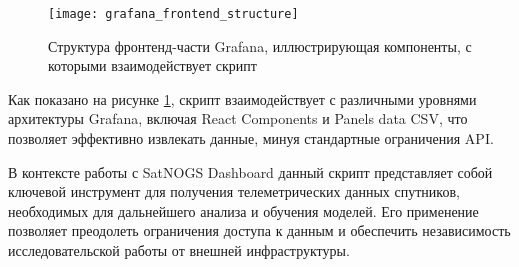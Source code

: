 \begin{figure}
	\centering
	\texttt{[image: grafana\_frontend\_structure]}
	\caption{Структура фронтенд-части Grafana, иллюстрирующая компоненты, с которыми взаимодействует скрипт}
	\label{fig:grafana_frontend_structure_advanced}
\end{figure}

Как показано на рисунке \ref{fig:grafana_frontend_structure_advanced}, скрипт
взаимодействует с различными уровнями архитектуры Grafana, включая React
Components и Panels data CSV, что позволяет эффективно извлекать данные, минуя
стандартные ограничения API.

В контексте работы с SatNOGS Dashboard данный скрипт представляет собой
ключевой инструмент для получения телеметрических данных спутников, необходимых
для дальнейшего анализа и обучения моделей. Его применение позволяет преодолеть
ограничения доступа к данным и обеспечить независимость исследовательской
работы от внешней инфраструктуры.
